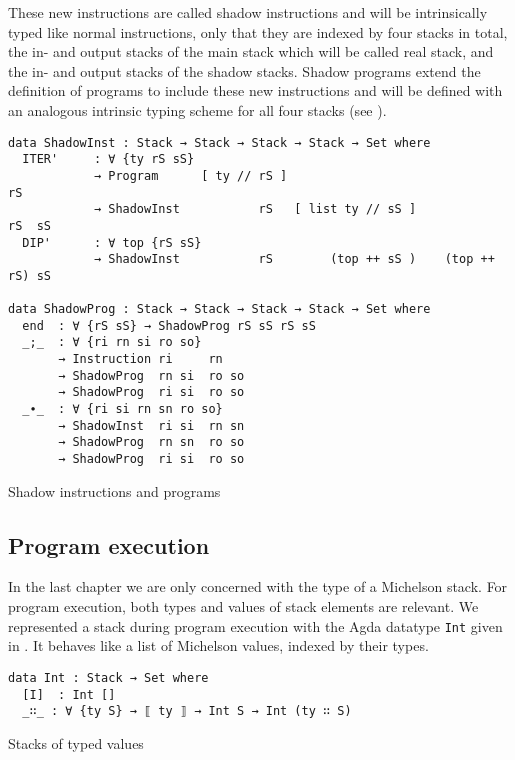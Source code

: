 These new instructions are called shadow instructions and will be intrinsically typed like
normal instructions, only that they are indexed by four stacks in total, the in- and output stacks
of the main stack which will be called real stack, and the in- and output stacks of the shadow
stacks.
Shadow programs extend the definition of programs to include these new instructions
and will be defined with an analogous intrinsic typing scheme for all four stacks
(see ).

\begin{listing}[!ht]
\begin{verbatim}
data ShadowInst : Stack → Stack → Stack → Stack → Set where
  ITER'     : ∀ {ty rS sS}
            → Program      [ ty // rS ]                              rS
            → ShadowInst           rS   [ list ty // sS ]            rS  sS
  DIP'      : ∀ top {rS sS}
            → ShadowInst           rS        (top ++ sS )    (top ++ rS) sS

data ShadowProg : Stack → Stack → Stack → Stack → Set where
  end  : ∀ {rS sS} → ShadowProg rS sS rS sS
  _;_  : ∀ {ri rn si ro so}
       → Instruction ri     rn
       → ShadowProg  rn si  ro so
       → ShadowProg  ri si  ro so
  _∙_  : ∀ {ri si rn sn ro so}
       → ShadowInst  ri si  rn sn
       → ShadowProg  rn sn  ro so
       → ShadowProg  ri si  ro so
\end{verbatim}
\caption{Shadow instructions and programs}
\label{shadow}
\end{listing}

\subsection{Program execution}

In the last chapter we are only concerned with the type of a Michelson stack.
For program execution, both types and values of stack elements are relevant.
We represented a stack during program execution with the Agda datatype \verb/Int/
given in .
It behaves like a list of Michelson values, indexed by their types.

\begin{listing}[!ht]
\begin{verbatim}
data Int : Stack → Set where
  [I]  : Int []
  _∷_ : ∀ {ty S} → ⟦ ty ⟧ → Int S → Int (ty ∷ S)
\end{verbatim}
\caption{Stacks of typed values}
\label{Int}
\end{listing}

